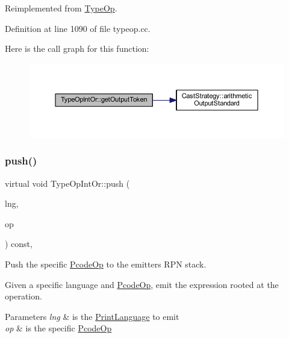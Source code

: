 Reimplemented from \mbox{\hyperlink{class_type_op_a7150ac93bb03a993735c829deb5237e7}{Type\+Op}}.



Definition at line 1090 of file typeop.\+cc.

Here is the call graph for this function\+:
\nopagebreak
\begin{figure}[H]
\begin{center}
\leavevmode
\includegraphics[width=350pt]{class_type_op_int_or_a73a740a728241ee2e922b29134c49cd4_cgraph}
\end{center}
\end{figure}
\mbox{\label{class_type_op_int_or_ade4437d6b019dad4cddbf857453e4c5b}} 
\subsubsection{\texorpdfstring{push()}{push()}}
{\footnotesize\ttfamily virtual void Type\+Op\+Int\+Or\+::push (\begin{DoxyParamCaption}\item[{\mbox{\hyperlink{class_print_language}{Print\+Language}} $\ast$}]{lng,  }\item[{const \mbox{\hyperlink{class_pcode_op}{Pcode\+Op}} $\ast$}]{op }\end{DoxyParamCaption}) const\hspace{0.3cm}{\ttfamily [inline]}, {\ttfamily [virtual]}}



Push the specific \mbox{\hyperlink{class_pcode_op}{Pcode\+Op}} to the emitter\textquotesingle{}s R\+PN stack. 

Given a specific language and \mbox{\hyperlink{class_pcode_op}{Pcode\+Op}}, emit the expression rooted at the operation. 
\begin{DoxyParams}{Parameters}
{\em lng} & is the \mbox{\hyperlink{class_print_language}{Print\+Language}} to emit \\
\hline
{\em op} & is the specific \mbox{\hyperlink{class_pcode_op}{Pcode\+Op}} \\
\hline
\end{DoxyParams}


